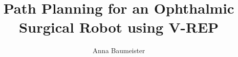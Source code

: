 \documentclass[11pt,a4paper,footexclude,headsepline,footsepline,BCOR12mm,DIV13]{scrbook}
\author{Anna Baumeister}
\title{Path Planning for an Ophthalmic Surgical Robot using V-REP}
\begin{document}

\cleardoublepage





\tableofcontents{}












\end{document}
